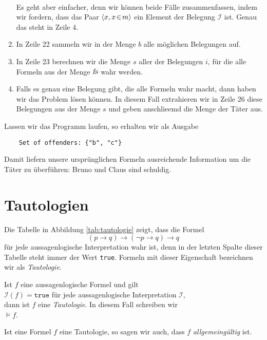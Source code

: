 \begin{enumerate}
      \\[0.2cm]
      Es geht aber einfacher, denn wir k\"{o}nnen beide F\"{a}lle zusammenfassen, indem wir fordern,
      dass das Paar $\pair(x, x \el m)$ ein Element der Belegung $\mathcal{I}$ ist. Genau
      das steht in Zeile 4.
\item In Zeile 22 sammeln wir in der Menge $b$ alle m\"{o}glichen Belegungen auf.
\item In Zeile 23 berechnen wir die Menge $s$ aller der Belegungen $i$, f\"{u}r die alle 
      Formeln aus der Menge $\textsl{fs}$ wahr werden. 
\item Falls es genau eine Belegung gibt, die alle Formeln wahr macht, 
      dann haben wir das Problem l\"{o}sen k\"{o}nnen.  In diesem Fall
      extrahieren wir in Zeile 26 diese Belegungen aus der Menge $s$ und geben
      anschlie\3emd die Menge der T\"{a}ter aus.
\end{enumerate}
Lassen wir das Programm laufen, so erhalten wir als Ausgabe
\begin{verbatim}
    Set of offenders: {"b", "c"}
\end{verbatim}
Damit liefern unsere urspr\"{u}nglichen Formeln ausreichende Information um die T\"{a}ter zu \"{u}berf\"{u}hren:
Bruno und Claus sind schuldig.


\section{Tautologien}
Die Tabelle in Abbildung \ref{tab:tautologie} zeigt, dass die Formel
$$  (p \rightarrow q) \rightarrow (\neg p \rightarrow q) \rightarrow q $$
f\"{u}r jede aussagenlogische Interpretation wahr ist, denn in der letzten Spalte dieser Tabelle steht immer der
Wert \texttt{true}.  Formeln mit dieser Eigenschaft  bezeichnen wir als \emph{Tautologie}.
\begin{Definition}[Tautologie]
  Ist $f$ eine aussagenlogische Formel und gilt \\[0.2cm]
  \hspace*{1.3cm} $\mathcal{I}(f) = \mathtt{true}$ \quad f\"{u}r jede aussagenlogische Interpretation $\mathcal{I}$, \\[0.2cm]
  dann ist $f$ eine \emph{Tautologie}.  In diesem Fall schreiben wir \\[0.2cm]
  \hspace*{1.3cm} $\models f$.
  \eox
\end{Definition}

\noindent
Ist eine Formel $f$ eine Tautologie, so sagen wir auch, dass $f$
\emph{allgemeing\"{u}ltig} ist.


